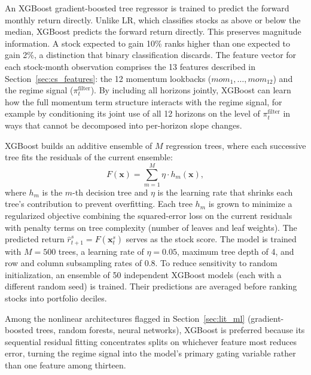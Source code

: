An XGBoost gradient-boosted tree regressor \citep{Chen2016} is trained to predict the forward monthly return directly. Unlike LR, which classifies stocks as above or below the median, XGBoost predicts the forward return directly. This preserves magnitude information. A stock expected to gain 10\% ranks higher than one expected to gain 2\%, a distinction that binary classification discards. The feature vector for each stock-month observation comprises the 13 features described in Section~\ref{sec:cs_features}: the 12 momentum lookbacks ($mom_1, \dots, mom_{12}$) and the regime signal ($\pi_t^{\text{filter}}$). By including all horizons jointly, XGBoost can learn how the full momentum term structure interacts with the regime signal, for example by conditioning its joint use of all 12 horizons on the level of $\pi_t^{\text{filter}}$ in ways that cannot be decomposed into per-horizon slope changes.

XGBoost builds an additive ensemble of $M$ regression trees, where each successive tree fits the residuals of the current ensemble:
\begin{equation}
    F(\mathbf{x}) = \sum_{m=1}^{M} \eta \cdot h_m(\mathbf{x}),
\end{equation}
where $h_m$ is the $m$-th decision tree and $\eta$ is the learning rate that shrinks each tree's contribution to prevent overfitting. Each tree $h_m$ is grown to minimize a regularized objective combining the squared-error loss on the current residuals with penalty terms on tree complexity (number of leaves and leaf weights). The predicted return $\hat{r}_{t+1}^s = F(\mathbf{x}_t^s)$ serves as the stock score. The model is trained with $M = 500$ trees, a learning rate of $\eta = 0.05$, maximum tree depth of 4, and row and column subsampling rates of 0.8. To reduce sensitivity to random initialization, an ensemble of 50 independent XGBoost models (each with a different random seed) is trained. Their predictions are averaged before ranking stocks into portfolio deciles.

Among the nonlinear architectures flagged in Section~\ref{sec:lit_ml} (gradient-boosted trees, random forests, neural networks), XGBoost is preferred because its sequential residual fitting concentrates splits on whichever feature most reduces error, turning the regime signal into the model's primary gating variable rather than one feature among thirteen.

